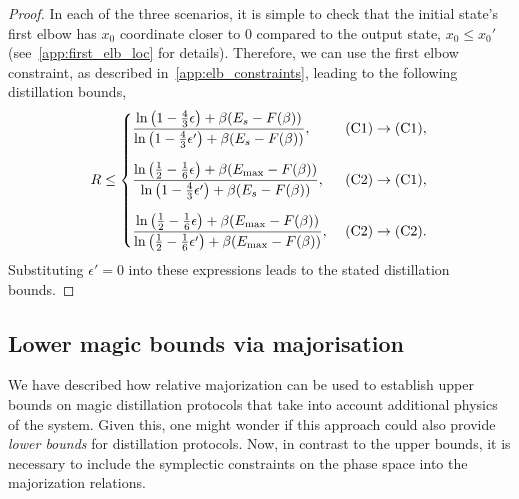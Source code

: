 \documentclass[pra,
aps,
twocolumn,
superscriptaddress,
groupedaddress,
nofootinbib,
reprint
]{revtex4-1}
\begin{document}
\begin{proof}
In each of the three scenarios, it is simple to check that the initial state's first elbow has $x_0$ coordinate closer to $0$ compared to the output state, $x_0 \leq x_0'$ (see~\cref{app:first_elb_loc} for details). Therefore, we can use the first elbow constraint, as described in~\cref{app:elb_constraints}, leading to the following distillation bounds,
\begin{equation}\label{eq:rate_bounds_proof}
	R \leq
	\begin{cases}
		\dfrac{\ln{\big( 1-\frac{4}{3}\epsilon \big)} + \beta (E_s - F(\beta))}{\ln{\big( 1-\frac{4}{3}\epsilon' \big)} + \beta (E_s - F(\beta))},\ &\rm{(C1)} \rightarrow \rm{(C1)}, \vspace{10pt}\\
		\dfrac{\ln{\big( \frac{1}{2}-\frac{1}{6}\epsilon \big)} + \beta (E_{\rm{max}} - F(\beta))}{\ln{\big( 1-\frac{4}{3}\epsilon' \big)} + \beta (E_s - F(\beta))},\ &\rm{(C2)} \rightarrow \rm{(C1)}, \vspace{10pt}\\
		\dfrac{\ln{\big( \frac{1}{2}-\frac{1}{6}\epsilon \big)} + \beta (E_{\rm{max}} - F(\beta))}{\ln{\big( \frac{1}{2}-\frac{1}{6}\epsilon' \big)} + \beta (E_{\rm{max}} - F(\beta))},\ &\rm{(C2)} \rightarrow \rm{(C2)}.
	\end{cases}
\end{equation}
Substituting $\epsilon' = 0$ into these expressions leads to the stated distillation bounds.

\end{proof}

\subsection{Lower magic bounds via majorisation}
\label{sec:lower_bounds}

We have described how relative majorization can be used to establish upper bounds on magic distillation protocols that take into account additional physics of the system. Given this, one might wonder if this approach could also provide \emph{lower bounds} for distillation protocols. Now, in contrast to the upper bounds, it is necessary to include the symplectic constraints on the phase space into the majorization relations.
\end{document}
